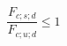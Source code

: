 \documentclass[12pt]{article}
\begin{document}
\begin{displaymath}
\frac {F_{c;s;d}} {F_{c;u;d}} \leq 1
\end{displaymath}
\end{document}
